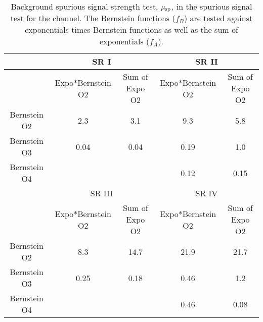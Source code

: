 \begin{table}[htbp]
\centering
\caption{Background spurious signal strength test, $\mu_{\rm sp}$, in the spurious signal test for the \fourcentral channel. The Bernstein functions ($f_B$) are tested against exponentials times Bernstein functions as well as the sum of exponentials ($f_A$).}
\label{tab:spurious-test-4cen}
\begin{tabular}{|c|c|c|c|c|}
\hline
             & \multicolumn{2}{c|}{SR I}                  & \multicolumn{2}{c|}{SR II}                 \\ \hline
             & Expo*Bernstein O2 & Sum of Expo O2 & Expo*Bernstein O2 & Sum of Expo O2 \\ \hline
Bernstein O2 & 2.3               & 3.1                    & 9.3               & 5.8                    \\ \hline
Bernstein O3 & 0.04              & 0.04                   & 0.19              & 1.0                    \\ \hline
Bernstein O4 &                   &                        & 0.12              & 0.15                   \\ \hline
             & \multicolumn{2}{c|}{SR III}                & \multicolumn{2}{c|}{SR IV}                 \\ \hline
             & Expo*Bernstein O2 & Sum of Expo O2 & Expo*Bernstein O2 & Sum of Expo O2 \\ \hline
Bernstein O2 & 8.3               & 14.7                   & 21.9              & 21.7                   \\ \hline
Bernstein O3 & 0.25              & 0.18                   & 0.46              & 1.2                    \\ \hline
Bernstein O4 &                   &                        & 0.46              & 0.08                   \\ \hline
\end{tabular}
\end{table}

